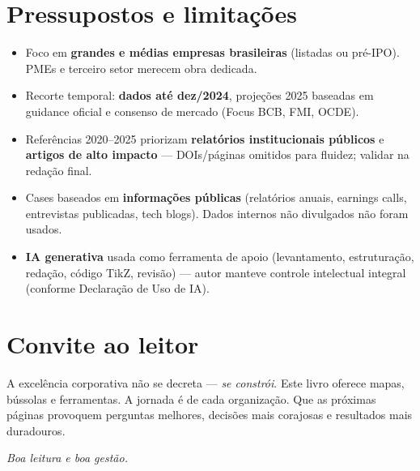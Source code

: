 \section*{Pressupostos e limitações}

\begin{itemize}
    \item Foco em \textbf{grandes e médias empresas brasileiras} (listadas ou pré-IPO). PMEs e terceiro setor merecem obra dedicada.
    \item Recorte temporal: \textbf{dados até dez/2024}, projeções 2025 baseadas em guidance oficial e consenso de mercado (Focus BCB, FMI, OCDE).
    \item Referências 2020–2025 priorizam \textbf{relatórios institucionais públicos} e \textbf{artigos de alto impacto} — DOIs/páginas omitidos para fluidez; validar na redação final.
    \item Cases baseados em \textbf{informações públicas} (relatórios anuais, earnings calls, entrevistas publicadas, tech blogs). Dados internos não divulgados não foram usados.
    \item \textbf{IA generativa} usada como ferramenta de apoio (levantamento, estruturação, redação, código TikZ, revisão) — autor manteve controle intelectual integral (conforme Declaração de Uso de IA).
\end{itemize}

\section*{Convite ao leitor}

A excelência corporativa não se decreta — \textit{se constrói}. Este livro oferece mapas, bússolas e ferramentas. A jornada é de cada organização. Que as próximas páginas provoquem perguntas melhores, decisões mais corajosas e resultados mais duradouros.

\vspace{0.5cm}
\noindent\textit{Boa leitura e boa gestão.}

